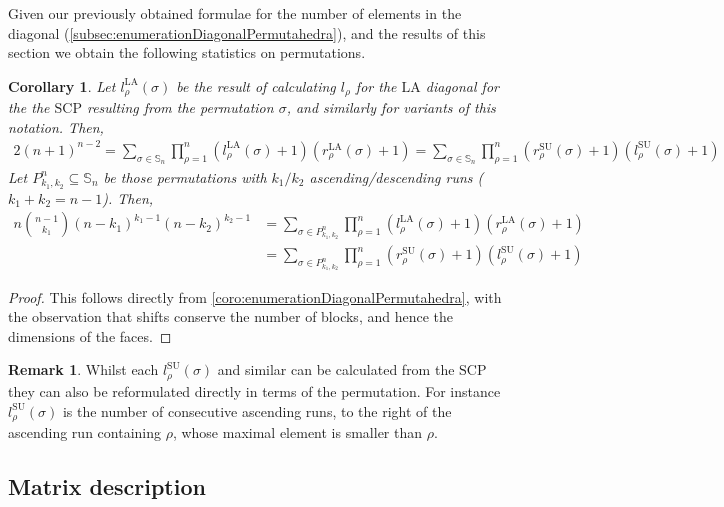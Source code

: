 \documentclass{amsart}
\newtheorem{corollary}[theorem]{Corollary}
\theoremstyle{definition}
\newtheorem{remark}[theorem]{Remark}
\newcommand{\SU}{\mathrm{SU}}
\newcommand{\LA}{\mathrm{LA}}
\newcommand{\SCP}{\mathrm{SCP}}
\begin{document}
Given our previously obtained formulae for the number of elements in the diagonal (\cref{subsec:enumerationDiagonalPermutahedra}), and the results of this section we obtain the following statistics on permutations.
\begin{corollary}
Let $l_\rho^{\LA}(\sigma)$ be the result of calculating $l_\rho$ for the $\LA$ diagonal for the the $\SCP$ resulting from the permutation $\sigma$, and similarly for variants of this notation. Then,
\begin{align*}
	2(n+1)^{n-2} = \sum_{\sigma \in \mathbb{S}_n} \prod_{\rho=1}^n (l_\rho^{\LA}(\sigma)+1)(r_\rho^{\LA}(\sigma)+1) 
	= \sum_{\sigma \in \mathbb{S}_n} \prod_{\rho=1}^n (r_\rho^{\SU}(\sigma)+1)(l_\rho^{\SU}(\sigma)+1)
\end{align*}
Let $P_{k_1,k_2}^n\subseteq \mathbb{S}_n$ be those permutations with $k_1/k_2$ ascending/descending runs ($k_1+k_2=n-1$). Then,
\begin{align*}
	n \binom{n-1}{k_1} (n-k_1)^{k_1-1} (n-k_2)^{k_2-1} &= \sum_{\sigma \in P_{k_1,k_2}^n} \prod_{\rho=1}^n (l_\rho^{\LA}(\sigma)+1)(r_\rho^{\LA}(\sigma)+1)\\
	&= \sum_{\sigma \in P_{k_1,k_2}^n} \prod_{\rho=1}^n (r_\rho^{\SU}(\sigma)+1)(l_\rho^{\SU}(\sigma)+1)
\end{align*}
\end{corollary}
\begin{proof}
This follows directly from \cref{coro:enumerationDiagonalPermutahedra}, with the observation that shifts conserve the number of blocks, and hence the dimensions of the faces.
\end{proof}

\begin{remark}
Whilst each $l_\rho^{\SU}(\sigma)$ and similar can be calculated from the $\SCP$ they can also be reformulated directly in terms of the permutation.
For instance $l_\rho^{\SU}(\sigma)$ is the number of consecutive ascending runs, to the right of the ascending run containing $\rho$, whose maximal element is smaller than $\rho$.
\end{remark}


\subsection{Matrix description}
\end{document}

